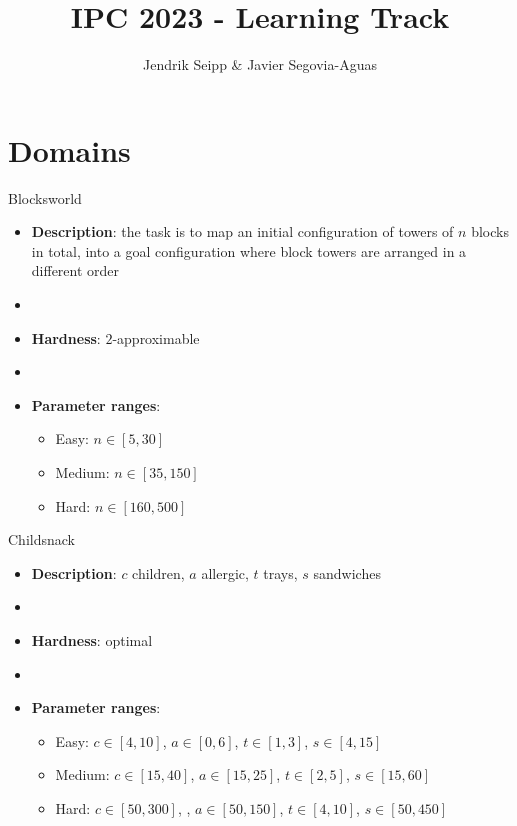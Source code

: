 \documentclass[aspectratio=169,xcolor=dvipsnames]{beamer}
\title[short title]{IPC 2023 - Learning Track} %
\author[Allauthors] {Jendrik Seipp \& Javier Segovia-Aguas}
\date{} %
\begin{document}
\begin{frame}
    \titlepage

\end{frame}

\section{Domains}

\begin{frame}{Blocksworld}

    \begin{itemize}
        \item \textbf{Description}: the task is to map an initial configuration of towers of $n$ blocks in total, into a goal configuration where block towers are arranged in a different order
        \item[]
        \item \textbf{Hardness}: $2$-approximable
        \item[]
        \item \textbf{Parameter ranges}:
        \begin{itemize}
            \item Easy: $n \in [5, 30]$
            \item Medium: $n \in [35, 150]$
            \item Hard: $n \in [160, 500]$
        \end{itemize}
    \end{itemize}

\end{frame}

\begin{frame}{Childsnack}

    \begin{itemize}
        \item \textbf{Description}: $c$ children, $a$ allergic, $t$ trays, $s$ sandwiches %
        \item[]
        \item \textbf{Hardness}: optimal
        \item[]
        \item \textbf{Parameter ranges}:
        \begin{itemize}
            \item Easy: $c\in[4, 10]$, $a\in[0, 6]$, $t\in[1, 3]$, $s\in[4, 15]$
            \item Medium: $c\in[15, 40]$, $a\in[15, 25]$, $t\in[2, 5]$, $s\in[15, 60]$
            \item Hard: $c\in[50, 300]$, , $a\in[50, 150]$, $t\in[4, 10]$, $s\in[50, 450]$
        \end{itemize}
    \end{itemize}

\end{frame}
\end{document}
